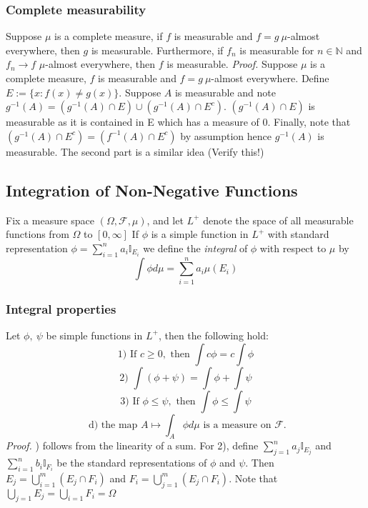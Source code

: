 \documentclass{article}
\begin{document}
\subsubsection{Complete measurability}
Suppose $\mu$ is a complete measure, if $f$ is measurable and $f=g  \ \mu$-almost everywhere, then $g$ is measurable. Furthermore, if $f_n$ is measurable for $n \in \mathbb{N}$ and $f_n\to f$ $\mu$-almost everywhere, then $f$ is measurable. \newline \newline
\textit{Proof.}\newline \newline
Suppose  $\mu$ is a complete measure, $f$ is measurable and $f=g  \ \mu$-almost everywhere. Define $E:=\{x:f(x)\neq g(x)\}$. Suppose $A$ is measurable and note $g^{-1}(A) = (g^{-1}(A)\cap E) \cup (g^{-1}(A)\cap E^c)$. $(g^{-1}(A)\cap E)$ is measurable as it is contained in E which has a measure of 0. Finally, note that $(g^{-1}(A)\cap E^c)=(f^{-1}(A)\cap E^c)$ by assumption hence $g^{-1}(A)$ is measurable. \newline \newline
The second part is a similar idea (Verify this!)

\subsection{Integration of Non-Negative Functions}
Fix a measure space $(\Omega, \mathcal{F}, \mu)$, and let $L^+$ denote the space of all measurable functions from $\Omega$ to  $[0,\infty]$ If $\phi$ is a simple function in $L^+$ with standard representation $\phi = \sum_{i=1}^na_i\mathbb{I}_{E_i}$ we define the \emph{integral} of $\phi$ with respect to $\mu$ by 
\[
\int\phi d\mu= \sum_{i=1}^na_i\mu(E_i)
\]

\subsubsection{Integral properties}
Let $\phi, \ \psi$ be simple functions in $L^+$, then the following hold:
\[
\text{1) If } c\geq 0, \text{ then } \int c\phi = c\int \phi
\]
\[
\text{2) }\int (\phi+ \psi) = \int \phi+ \int\psi
\]
\[
\text{3) If } \phi \leq \psi, \text{ then } \int \phi \leq \int \psi
\]
\[
\text{ d) the map } A\mapsto\int_A\phi d\mu \text{ is a measure on } \mathcal{F}.
\]
\textit{Proof.} \newline {}) follows from the linearity of a sum. For 2), define $\sum_{j=1}^na_j\mathbb{I}_{E_j}$ and $\sum_{i=1}^nb_i\mathbb{I}_{F_i}$ be the standard representations of $\phi$ and $\psi$. Then $E_j = \bigcup_{i=1}^m(E_j\cap F_i)$ and $F_i = \bigcup_{j=1}^m(E_j\cap F_i)$. Note that $\bigcup_{j=1}E_j=\bigcup_{i=1}F_i=\Omega$
\end{document}
